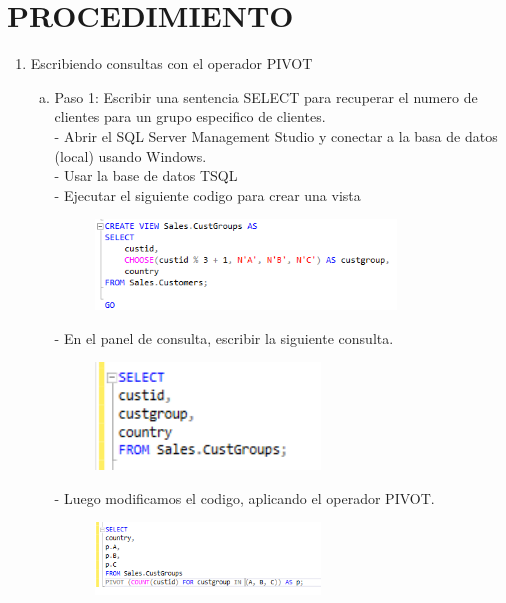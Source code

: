 \section{PROCEDIMIENTO} 


\begin{enumerate}[1.]
	\item Escribiendo consultas con el operador PIVOT
	\begin{enumerate}[a)]
	\item Paso 1: Escribir una sentencia SELECT para recuperar el numero de clientes para un grupo especifico de clientes.\\
		-  Abrir el SQL Server Management Studio y conectar a la basa de datos (local) usando Windows.\\
		-  Usar la base de datos TSQL\\
		-  Ejecutar el siguiente codigo para crear una vista\\
		\begin{figure}[H]
		\begin{center}
		\includegraphics[width=8cm]{./Imagenes/1-1}
		\end{center}
		\end{figure}
		-  En el panel de consulta, escribir la siguiente consulta.
		\begin{figure}[H]
		\begin{center}
		\includegraphics[width=6cm]{./Imagenes/c1}
		\end{center}
		\end{figure}
		-  Luego modificamos el codigo, aplicando el operador PIVOT.
		\begin{figure}[H]
		\begin{center}
		\includegraphics[width=6cm]{./Imagenes/c2}

\end{center}
\end{figure}
\end{enumerate}
\end{enumerate}
